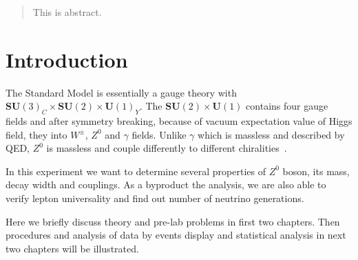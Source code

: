 \begin{abstract}
	This is abstract.
\end{abstract}
\section{Introduction}
The Standard Model is essentially a gauge theory with $\mathbf{SU}(3)_C \times \mathbf{SU}(2) \times \mathbf{U}(1)_Y$. The $\mathbf{SU}(2) \times \mathbf{U}(1)$ contains four gauge fields and after symmetry breaking, because of vacuum expectation value of Higgs field, they into $W^{\pm}$, $Z^0$ and $\gamma$ fields. Unlike $\gamma$ which is massless and described by QED, $Z^0$ is massless and couple differently to different chiralities~\cite{Tapei}.

In this experiment we want to determine several properties of $Z^0$ boson, its mass, decay width and couplings. As a byproduct the analysis, we are also able to verify lepton universality and find out number of neutrino generations.

Here we briefly discuss theory and pre-lab problems in first two chapters. Then procedures and analysis of data by events display and statistical analysis in next two chapters will be illustrated. 
